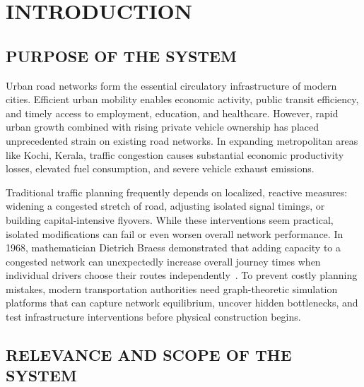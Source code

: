 \documentclass[12pt,a4paper]{report}
\begin{document}
\newpage
\begingroup
\makeatletter
\renewcommand\clearpage{}
\renewcommand\cleardoublepage{}
\makeatother
\listoffigures
\vspace{0.8cm}
\listoftables
\endgroup

\newpage
{}
\setcounter{page}{1}

\chapter{INTRODUCTION}
\label{chap:intro}

\section{PURPOSE OF THE SYSTEM}
Urban road networks form the essential circulatory infrastructure of modern cities. Efficient urban mobility enables economic activity, public transit efficiency, and timely access to employment, education, and healthcare. However, rapid urban growth combined with rising private vehicle ownership has placed unprecedented strain on existing road networks. In expanding metropolitan areas like Kochi, Kerala, traffic congestion causes substantial economic productivity losses, elevated fuel consumption, and severe vehicle exhaust emissions.

Traditional traffic planning frequently depends on localized, reactive measures: widening a congested stretch of road, adjusting isolated signal timings, or building capital-intensive flyovers. While these interventions seem practical, isolated modifications can fail or even worsen overall network performance. In 1968, mathematician Dietrich Braess demonstrated that adding capacity to a congested network can unexpectedly increase overall journey times when individual drivers choose their routes independently~\cite{braess1968}. To prevent costly planning mistakes, modern transportation authorities need graph-theoretic simulation platforms that can capture network equilibrium, uncover hidden bottlenecks, and test infrastructure interventions before physical construction begins.

\section{RELEVANCE AND SCOPE OF THE SYSTEM}
\end{document}
